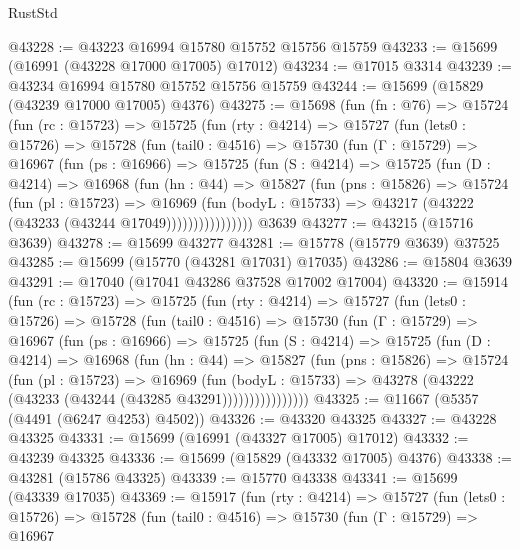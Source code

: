 \begin{lexlean}{RustStd}
\begin{coremodule}
@43228 := @43223 @16994 @15780 @15752 @15756 @15759
@43233 := @15699 (@16991 (@43228 @17000 @17005) @17012)
@43234 := @17015 @3314
@43239 := @43234 @16994 @15780 @15752 @15756 @15759
@43244 := @15699 (@15829 (@43239 @17000 @17005) @4376)
@43275 := @15698
    (fun (fn : @76) =>
    @15724
      (fun (rc : @15723) =>
      @15725
        (fun (rty : @4214) =>
        @15727
          (fun (lets0 : @15726) =>
          @15728
            (fun (tail0 : @4516) =>
            @15730
              (fun (Γ : @15729) =>
              @16967
                (fun (ps : @16966) =>
                @15725
                  (fun (S : @4214) =>
                  @15725
                    (fun (D : @4214) =>
                    @16968
                      (fun (hn : @44) =>
                      @15827
                        (fun (pns : @15826) =>
                        @15724
                          (fun (pl : @15723) =>
                          @16969
                            (fun (bodyL : @15733) =>
                            @43217 (@43222 (@43233 (@43244 @17049))))))))))))))))
    @3639
@43277 := @43215 (@15716 @3639)
@43278 := @15699 @43277
@43281 := @15778 (@15779 @3639) @37525
@43285 := @15699 (@15770 (@43281 @17031) @17035)
@43286 := @15804 @3639
@43291 := @17040 (@17041 @43286 @37528 @17002 @17004)
@43320 := @15914
    (fun (rc : @15723) =>
    @15725
      (fun (rty : @4214) =>
      @15727
        (fun (lets0 : @15726) =>
        @15728
          (fun (tail0 : @4516) =>
          @15730
            (fun (Γ : @15729) =>
            @16967
              (fun (ps : @16966) =>
              @15725
                (fun (S : @4214) =>
                @15725
                  (fun (D : @4214) =>
                  @16968
                    (fun (hn : @44) =>
                    @15827
                      (fun (pns : @15826) =>
                      @15724
                        (fun (pl : @15723) =>
                        @16969
                          (fun (bodyL : @15733) =>
                          @43278 (@43222 (@43233 (@43244 (@43285 @43291))))))))))))))))
@43325 := @11667 (@5357 (@4491 (@6247 @4253) @4502))
@43326 := @43320 @43325
@43327 := @43228 @43325
@43331 := @15699 (@16991 (@43327 @17005) @17012)
@43332 := @43239 @43325
@43336 := @15699 (@15829 (@43332 @17005) @4376)
@43338 := @43281 (@15786 @43325)
@43339 := @15770 @43338
@43341 := @15699 (@43339 @17035)
@43369 := @15917
    (fun (rty : @4214) =>
    @15727
      (fun (lets0 : @15726) =>
      @15728
        (fun (tail0 : @4516) =>
        @15730
          (fun (Γ : @15729) =>
          @16967

\end{coremodule}
\end{lexlean}
